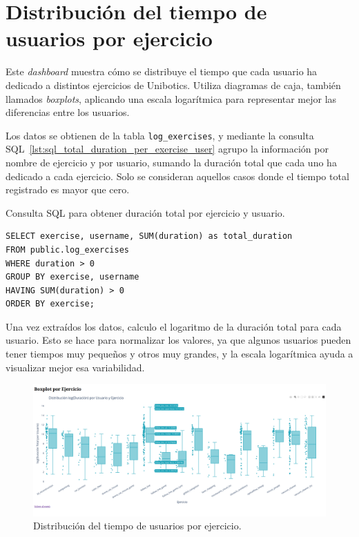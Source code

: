 \documentclass[a4paper, 12pt]{book}
\begin{document}
\section{Distribución del tiempo de usuarios por ejercicio}
\label{sec:dash3b}

Este \textit{dashboard} muestra cómo se distribuye el tiempo que cada usuario ha dedicado a distintos ejercicios de Unibotics. Utiliza diagramas de caja, también llamados \textit{boxplots}, aplicando una escala logarítmica para representar mejor las diferencias entre los usuarios.

Los datos se obtienen de la tabla \texttt{log\_exercises}, y mediante la consulta SQL~\ref{lst:sql_total_duration_per_exercise_user} agrupo la información por nombre de ejercicio y por usuario, sumando la duración total que cada uno ha dedicado a cada ejercicio. Solo se consideran aquellos casos donde el tiempo total registrado es mayor que cero.

\begin{listing}[h!]
\caption{Consulta SQL para obtener duración total por ejercicio y usuario.}
\label{lst:sql_total_duration_per_exercise_user}
\begin{verbatim}
SELECT exercise, username, SUM(duration) as total_duration
FROM public.log_exercises
WHERE duration > 0
GROUP BY exercise, username
HAVING SUM(duration) > 0
ORDER BY exercise;
\end{verbatim}
\end{listing}

Una vez extraídos los datos, calculo el logaritmo de la duración total para cada usuario. Esto se hace para normalizar los valores, ya que algunos usuarios pueden tener tiempos muy pequeños y otros muy grandes, y la escala logarítmica ayuda a visualizar mejor esa variabilidad.

\begin{figure}[H]
  \centering
  \includegraphics[width=1.1\textwidth]{img/3bb.png}
  \caption{Distribución del tiempo de usuarios por ejercicio.}
  \label{fig:3b}
\end{figure}
\end{document}

